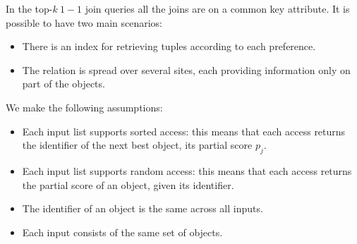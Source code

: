 \documentclass[12pt, a4paper]{report}
\newtheorem[style=M,bodystyle=\normalfont]{theorem}{Theorem}
\newtheorem[style=M,bodystyle=\normalfont]{corollary}{Corollary}
\newtheorem[style=M,bodystyle=\normalfont]{lemma}{Lemma}
\newtheorem[style=M,bodystyle=\normalfont]{definition}{Definition}
\begin{document}
    In the top-$k \: 1-1$ join queries all the joins are on a common key attribute. It is possible to have two main scenarios: 
    \begin{itemize}
        \item There is an index for retrieving tuples according to each preference. 
        \item The relation is spread over several sites, each providing information only on part of the objects.
    \end{itemize}
    We make the following assumptions: 
    \begin{itemize}
        \item Each input list supports sorted access: this means that each access returns the identifier of the next best object, its partial score $p_j$. 
        \item Each input list supports random access: this means that each access returns the partial score of an object, given its identifier. 
        \item The identifier of an object is the same across all inputs. 
        \item Each input consists of the same set of objects. 
    \end{itemize}
\end{document}
